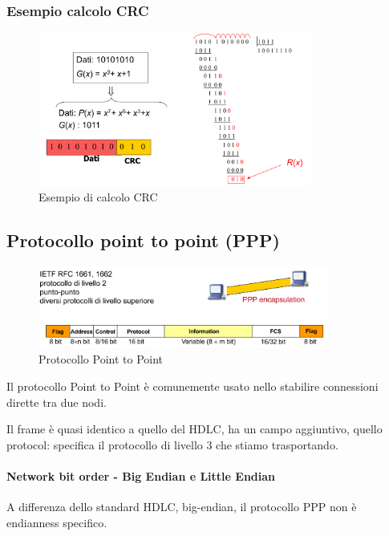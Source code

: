     \subsubsection{Esempio calcolo CRC}
    \begin{figure}[htbp]
        \centering
        \includegraphics[width=0.8\textwidth]{images/esempiocrc.png}
        \caption{Esempio di calcolo CRC}
        \label{fig:esempio-crc}
    \end{figure}

    \subsection{Protocollo point to point (PPP)}

    \begin{figure}[htbp]
        \centering
        \includegraphics[width=0.85\textwidth]{images/pointtopoint.png}
        \caption{Protocollo Point to Point}
        \label{fig:point-to-point}
    \end{figure}

Il protocollo Point to Point è comunemente usato nello stabilire connessioni dirette tra due nodi.

Il frame è quasi identico a quello del HDLC, ha un campo aggiuntivo, quello protocol: specifica il protocollo di livello 3 che stiamo trasportando.

\paragraph{Network bit order - Big Endian e Little Endian}
A differenza dello standard HDLC, big-endian, il protocollo PPP non è endianness specifico.

